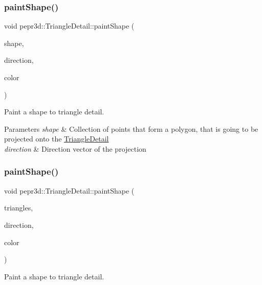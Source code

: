 \subsubsection{\texorpdfstring{paintShape()}{paintShape()}\hspace{0.1cm}{\footnotesize\ttfamily [1/2]}}
{\footnotesize\ttfamily void pepr3d\+::\+Triangle\+Detail\+::paint\+Shape (\begin{DoxyParamCaption}\item[{const std\+::vector$<$ Pepr\+Point3 $>$ \&}]{shape,  }\item[{const Pepr\+Vector3 \&}]{direction,  }\item[{size\+\_\+t}]{color }\end{DoxyParamCaption})}



Paint a shape to triangle detail. 


\begin{DoxyParams}{Parameters}
{\em shape} & Collection of points that form a polygon, that is going to be projected onto the \mbox{\hyperlink{classpepr3d_1_1_triangle_detail}{Triangle\+Detail}} \\
\hline
{\em direction} & Direction vector of the projection \\
\hline
\end{DoxyParams}
\mbox{\label{classpepr3d_1_1_triangle_detail_a7a2dc9dd17ebc6ec57e4598a9ce48bad}} 
\subsubsection{\texorpdfstring{paintShape()}{paintShape()}\hspace{0.1cm}{\footnotesize\ttfamily [2/2]}}
{\footnotesize\ttfamily void pepr3d\+::\+Triangle\+Detail\+::paint\+Shape (\begin{DoxyParamCaption}\item[{const std\+::vector$<$ Pepr\+Triangle $>$ \&}]{triangles,  }\item[{const Pepr\+Vector3 \&}]{direction,  }\item[{size\+\_\+t}]{color }\end{DoxyParamCaption})}



Paint a shape to triangle detail. 



